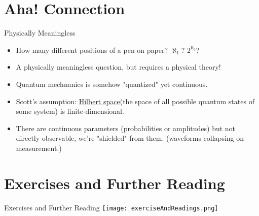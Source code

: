 \documentclass[
    11pt, %
    aspectratio=169, %
]{beamer}
\begin{document}
\section{Aha! Connection}
\begin{frame}{Physically Meaningless}
\begin{itemize}
    \item How many different positions of a pen on paper? $\aleph_1$?  $2^{\aleph_0}$?
    \item A physically meaningless question, but requires a physical theory!
    \item Quantum mechnanics is somehow "quantized" yet continuous.
    \item Scott's assumption: \href{https://www.google.com/search?q=hilbert+space&rlz=1C1CHBD_enIN1013IN1013&sxsrf=AJOqlzWw92tsrRiWqy1BJLIvsWLRpFqF-Q:1679559886629&source=lnms&tbm=isch&sa=X&ved=2ahUKEwjfpK-T0PH9AhUpzzgGHZL6DwUQ_AUoAXoECAEQAw&biw=1280&bih=577&dpr=1.5#imgrc=b_3ncQ7CReTCqM}{Hilbert space}(the space of all possible quantum states of some system) is finite-dimensional.
    \item There are continuous parameters (probabilities or amplitudes) but not directly observable, we're "shielded" from them. (waveforms collapsing on measurement.)
\end{itemize}
\end{frame}

\section{Exercises and Further Reading}
\begin{frame}{Exercises and Further Reading}
    \centering
    \texttt{[image: exerciseAndReadings.png]}
\end{frame}
\end{document}
